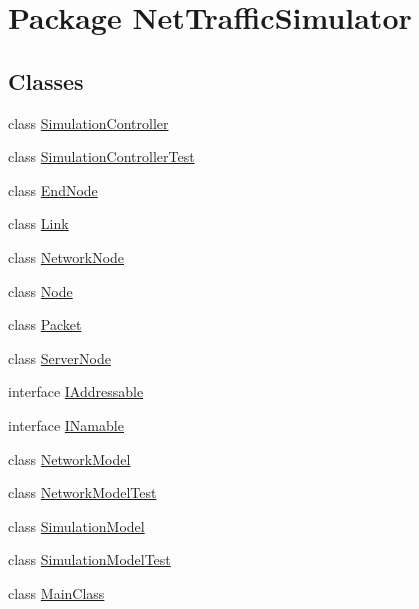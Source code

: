 \hypertarget{namespaceNetTrafficSimulator}{\section{Package Net\-Traffic\-Simulator}
\label{namespaceNetTrafficSimulator}
}
\subsection*{Classes}
\begin{DoxyCompactItemize}
\item 
class \hyperlink{classNetTrafficSimulator_1_1SimulationController}{Simulation\-Controller}
\item 
class \hyperlink{classNetTrafficSimulator_1_1SimulationControllerTest}{Simulation\-Controller\-Test}
\item 
class \hyperlink{classNetTrafficSimulator_1_1EndNode}{End\-Node}
\item 
class \hyperlink{classNetTrafficSimulator_1_1Link}{Link}
\item 
class \hyperlink{classNetTrafficSimulator_1_1NetworkNode}{Network\-Node}
\item 
class \hyperlink{classNetTrafficSimulator_1_1Node}{Node}
\item 
class \hyperlink{classNetTrafficSimulator_1_1Packet}{Packet}
\item 
class \hyperlink{classNetTrafficSimulator_1_1ServerNode}{Server\-Node}
\item 
interface \hyperlink{interfaceNetTrafficSimulator_1_1IAddressable}{I\-Addressable}
\item 
interface \hyperlink{interfaceNetTrafficSimulator_1_1INamable}{I\-Namable}
\item 
class \hyperlink{classNetTrafficSimulator_1_1NetworkModel}{Network\-Model}
\item 
class \hyperlink{classNetTrafficSimulator_1_1NetworkModelTest}{Network\-Model\-Test}
\item 
class \hyperlink{classNetTrafficSimulator_1_1SimulationModel}{Simulation\-Model}
\item 
class \hyperlink{classNetTrafficSimulator_1_1SimulationModelTest}{Simulation\-Model\-Test}
\item 
class \hyperlink{classNetTrafficSimulator_1_1MainClass}{Main\-Class}
\end{DoxyCompactItemize}

